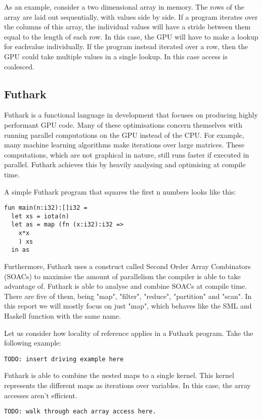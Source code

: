 \documentclass{article}
\begin{document}
As an example, consider a two dimensional array in memory. The rows of the array are laid out sequentially, with values side by side. If a program iterates over
the columns of this array, the individual values will have a stride between them equal to the length of each row. In this case, the GPU will have to make a
lookup for eachvalue individually. If the program instead iterated over a row, then the GPU could take multiple values in a single lookup. In this case access
is coalesced.

\subsection{Futhark}

Futhark is a functional language in development that focuses on producing highly performant GPU code. Many of these optimisations concern themselves with
running parallel computations on the GPU instead of the CPU. For example, many machine learning algorithms make iterations over large matrices. These
computations, which are not graphical in nature, still runs faster if executed in parallel. Futhark achieves this by heavily analysing and optimising at compile
time.

A simple Futhark program that squares the first n numbers looks like this:
\begin{verbatim}
fun main(n:i32):[]i32 =
  let xs = iota(n)
  let as = map (fn (x:i32):i32 =>
    x*x
    ) xs
  in as
\end{verbatim}

Furthermore, Futhark uses a construct called Second Order Array Combinators (SOACs) to maximise the amount of parallelism the compiler is able to take advantage
of.  Futhark is able to analyse and combine SOACs at compile time. There are five of them, being "map", "filter", "reduce", "partition" and "scan". In this
report we will mostly focus on just "map", which behaves like the SML and Haskell function with the same name.

Let us consider how locality of reference applies in a Futhark program. Take the following example:

\begin{verbatim}
TODO: insert driving example here
\end{verbatim}

Futhark is able to combine the nested maps to a single kernel. This kernel represents the different maps as iterations over variables. In this case, the array
accesses aren't efficient. 
\begin{verbatim}
TODO: walk through each array access here.
\end{verbatim}
\end{document}

